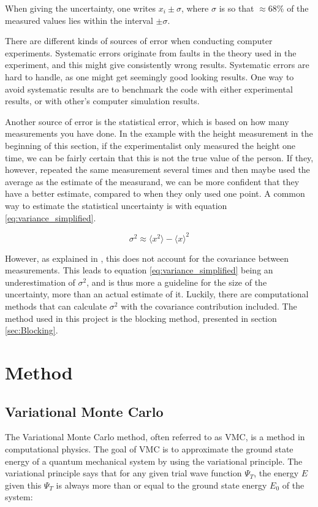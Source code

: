 \documentclass[norsk,a4paper,12pt]{article}
\begin{document}
When giving the uncertainty, one writes $x_i \pm \sigma$, where $\sigma$ is so that $\approx 68 \%$ of the measured values lies within the interval $\pm \sigma$. 

There are different kinds of sources of error when conducting computer experiments. Systematic errors originate from faults in the theory used in the experiment, and this might give consistently wrong results. Systematic errors are hard to handle, as one might get seemingly good looking results. One way to avoid systematic results are to benchmark the code with either experimental results, or with other's computer simulation results. \par 
\vspace{3mm}
Another source of error is the statistical error, which is based on how many measurements you have done. In the example with the height measurement in the beginning of this section, if the experimentalist only measured the height one time, we can be fairly certain that this is not the true value of the person. If they, however, repeated the same measurement several times and then maybe used the average as the estimate of the measurand, we can be more confident that they have a better estimate, compared to when they only used one point. A common way to estimate the statistical uncertainty is with equation \ref{eq:variance_simplified}.

\begin{equation}
\label{eq:variance_simplified}
\sigma^2 \approx \langle x^2 \rangle - \langle x \rangle^2
\end{equation}

However, as explained in \cite{Nordhagen}, this does not account for the covariance between measurements. This leads to equation \ref{eq:variance_simplified} being an underestimation of $\sigma^2$, and is thus more a guideline for the size of the uncertainty, more than an actual estimate of it. Luckily, there are computational methods that can calculate $\sigma^2$ with the covariance contribution included. The method used in this project is the blocking method, presented in section \ref{sec:Blocking}.

\section{Method} \label{sec:Method}

\subsection{Variational Monte Carlo}
The Variational Monte Carlo method, often referred to as VMC, is a method in computational physics. The goal of VMC is to approximate the ground state energy of a quantum mechanical system by using the variational principle. The variational principle says that for any given trial wave function $\Psi_T$, the energy $E$ given this $\Psi_T$ is always more than or equal to the ground state energy $E_0$ of the system:
\end{document}
